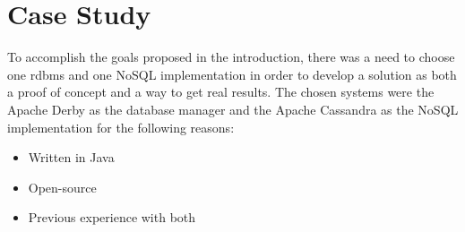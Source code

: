 \begin{table}[h!b!p!]
\caption{Differences between NoSQL and RDBMS}
\label{tab:diff}
\end{table}	  

\section{Case Study}
To accomplish the goals proposed in the introduction, there was a need to choose one \ac{rdbms} and one NoSQL implementation in order to develop a solution as both a proof of concept and a way to get real results. The chosen systems were the Apache Derby as the database manager and the Apache Cassandra as the NoSQL implementation for the following reasons:

\begin{itemize}
	\item Written in Java
	\item Open-source
	\item Previous experience with both
\end{itemize}

		
